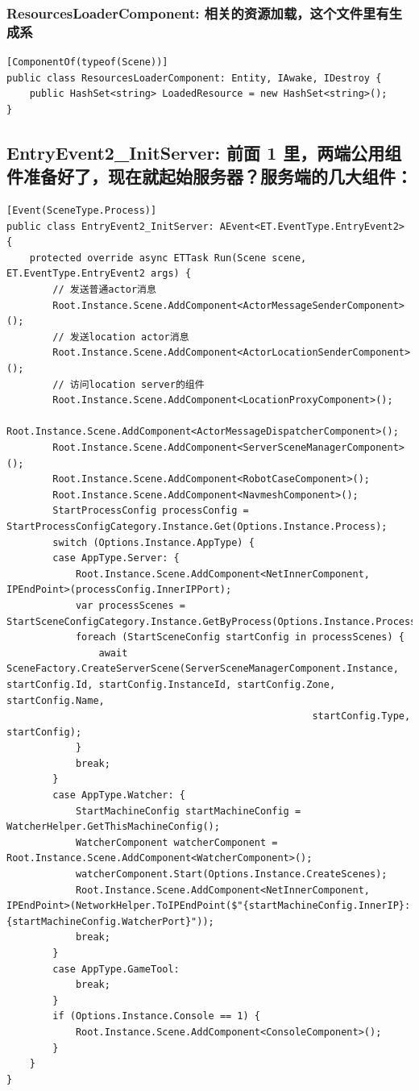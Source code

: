 \documentclass[9pt, b5paper]{article}
\begin{document}
\subsubsection{ResourcesLoaderComponent: 相关的资源加载，这个文件里有生成系}
\label{sec-1-3-3}
\begin{verbatim}
[ComponentOf(typeof(Scene))]
public class ResourcesLoaderComponent: Entity, IAwake, IDestroy {
    public HashSet<string> LoadedResource = new HashSet<string>();
}
\end{verbatim}
\subsection{EntryEvent2\_InitServer: 前面 1 里，两端公用组件准备好了，现在就起始服务器？服务端的几大组件：}
\label{sec-1-4}
\begin{verbatim}
[Event(SceneType.Process)]
public class EntryEvent2_InitServer: AEvent<ET.EventType.EntryEvent2> {
    protected override async ETTask Run(Scene scene, ET.EventType.EntryEvent2 args) {
        // 发送普通actor消息
        Root.Instance.Scene.AddComponent<ActorMessageSenderComponent>();
        // 发送location actor消息
        Root.Instance.Scene.AddComponent<ActorLocationSenderComponent>();
        // 访问location server的组件
        Root.Instance.Scene.AddComponent<LocationProxyComponent>();
        Root.Instance.Scene.AddComponent<ActorMessageDispatcherComponent>();
        Root.Instance.Scene.AddComponent<ServerSceneManagerComponent>();
        Root.Instance.Scene.AddComponent<RobotCaseComponent>();
        Root.Instance.Scene.AddComponent<NavmeshComponent>();
        StartProcessConfig processConfig = StartProcessConfigCategory.Instance.Get(Options.Instance.Process);
        switch (Options.Instance.AppType) {
        case AppType.Server: {
            Root.Instance.Scene.AddComponent<NetInnerComponent, IPEndPoint>(processConfig.InnerIPPort);
            var processScenes = StartSceneConfigCategory.Instance.GetByProcess(Options.Instance.Process);
            foreach (StartSceneConfig startConfig in processScenes) {
                await SceneFactory.CreateServerScene(ServerSceneManagerComponent.Instance, startConfig.Id, startConfig.InstanceId, startConfig.Zone, startConfig.Name,
                                                     startConfig.Type, startConfig);
            }
            break;
        }
        case AppType.Watcher: {
            StartMachineConfig startMachineConfig = WatcherHelper.GetThisMachineConfig();
            WatcherComponent watcherComponent = Root.Instance.Scene.AddComponent<WatcherComponent>();
            watcherComponent.Start(Options.Instance.CreateScenes);
            Root.Instance.Scene.AddComponent<NetInnerComponent, IPEndPoint>(NetworkHelper.ToIPEndPoint($"{startMachineConfig.InnerIP}:{startMachineConfig.WatcherPort}"));
            break;
        }
        case AppType.GameTool:
            break;
        }
        if (Options.Instance.Console == 1) {
            Root.Instance.Scene.AddComponent<ConsoleComponent>();
        }
    }
}
\end{verbatim}
\end{document}
